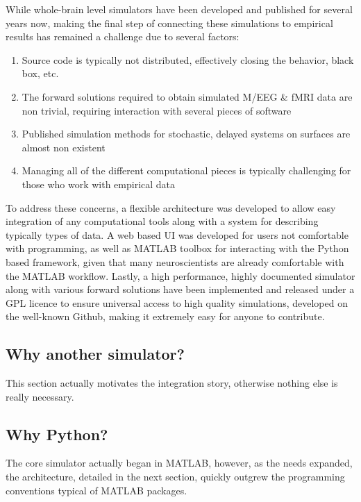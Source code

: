 
While whole-brain level simulators have been developed and published for
several years now, making the final step of connecting these simulations to
empirical results has remained a challenge due to several factors:

\begin{enumerate}
	\item Source code is typically not distributed, effectively closing
	the behavior, black box, etc. 

	\item The forward solutions required to obtain simulated M/EEG \& fMRI
	data are non trivial, requiring interaction with several pieces of software

	\item Published simulation methods for stochastic, delayed systems on
	surfaces are almost non existent

	\item Managing all of the different computational pieces is typically
	challenging for those who work with empirical data

\end{enumerate}

To address these concerns, a flexible architecture was developed to
allow easy integration of any computational tools along with a system
for describing typically types of data. A web based UI was developed
for users not comfortable with programming, as well as MATLAB toolbox
for interacting with the Python based framework, given that many
neuroscientists are already comfortable with the MATLAB workflow.
Lastly, a high performance, highly documented simulator along with
various forward solutions have been implemented and released under a
GPL licence to ensure universal access to high quality simulations, 
developed on the well-known Github, making it extremely easy for 
anyone to contribute.

\subsection{Why another simulator?}

This section actually motivates the integration story, otherwise 
nothing else is really necessary.

\subsection{Why Python?}

The core simulator actually began in MATLAB, however, as the needs 
expanded, the architecture, detailed in the next section, quickly 
outgrew the programming conventions typical of MATLAB packages.

